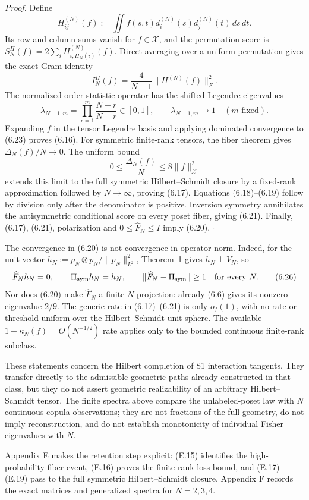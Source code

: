 \documentclass[11pt]{article}
\begin{document}
\emph{Proof.} Define \[ H_{ij}^{(N)}(f) :=\iint f(s,t)d_i^{(N)}(s)d_j^{(N)}(t)\,ds\,dt. \tag{6.22} \] Its row and column sums vanish for \(f\in\mathcal X\), and the permutation score is \(S_N^\Pi(f)=2\sum_iH_{i,\Pi_N(i)}^{(N)}(f)\). Direct averaging over a uniform permutation gives the exact Gram identity \[ I_N^\Pi(f)=\frac4{N-1}\|H^{(N)}(f)\|_F^2. \tag{6.23} \] The normalized order-statistic operator has the shifted-Legendre eigenvalues \[ \lambda_{N-1,m} =\prod_{r=1}^m\frac{N-r}{N+r}\in[0,1], \qquad \lambda_{N-1,m}\longrightarrow1 \quad(m\text{ fixed}). \tag{6.24} \] Expanding \(f\) in the tensor Legendre basis and applying dominated convergence to (6.23) proves (6.16). For symmetric finite-rank tensors, the fiber theorem gives \(\Delta_N(f)/N\to0\). The uniform bound \[ 0\le\frac{\Delta_N(f)}N\le8\|f\|_{\mathcal X}^2 \tag{6.25} \] extends this limit to the full symmetric Hilbert--Schmidt closure by a fixed-rank approximation followed by \(N\to\infty\), proving (6.17). Equations (6.18)--(6.19) follow by division only after the denominator is positive. Inversion symmetry annihilates the antisymmetric conditional score on every poset fiber, giving (6.21). Finally, (6.17), (6.21), polarization and \(0\le\widehat F_N\le I\) imply (6.20). \(\square\)

The convergence in (6.20) is not convergence in operator norm. Indeed, for the unit vector \(h_N:=p_N\otimes p_N/\|p_N\|_{L^2}^2\), Theorem~1 gives \(h_N\perp V_N\), so \[ \widehat F_Nh_N=0, \qquad \Pi_{\rm sym}h_N=h_N, \qquad \|\widehat F_N-\Pi_{\rm sym}\|\ge1 \quad\text{for every }N. \tag{6.26} \] Nor does (6.20) make \(\widehat F_N\) a finite-\(N\) projection: already (6.6) gives its nonzero eigenvalue \(2/9\). The generic rate in (6.17)--(6.21) is only \(o_f(1)\), with no rate or threshold uniform over the Hilbert--Schmidt unit sphere. The available \(1-\kappa_N(f)=O(N^{-1/2})\) rate applies only to the bounded continuous finite-rank subclass.

These statements concern the Hilbert completion of S1 interaction tangents. They transfer directly to the admissible geometric paths already constructed in that class, but they do not assert geometric realizability of an arbitrary Hilbert--Schmidt tensor. The finite spectra above compare the unlabeled-poset law with \(N\) continuous copula observations; they are not fractions of the full geometry, do not imply reconstruction, and do not establish monotonicity of individual Fisher eigenvalues with \(N\).

Appendix E makes the retention step explicit: (E.15) identifies the high-probability fiber event, (E.16) proves the finite-rank loss bound, and (E.17)--(E.19) pass to the full symmetric Hilbert--Schmidt closure. Appendix F records the exact matrices and generalized spectra for \(N=2,3,4\).
\end{document}
